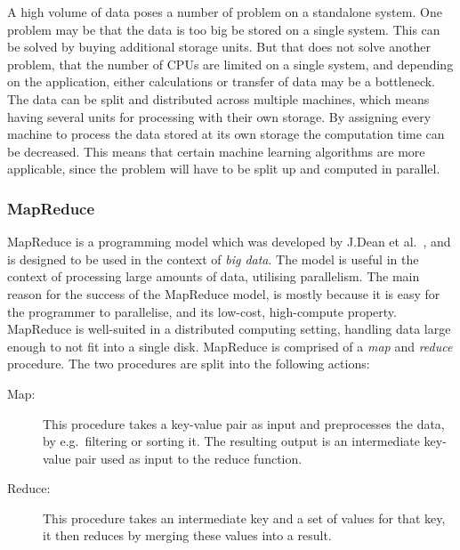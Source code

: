 A high volume of data poses a number of problem on a standalone system. One problem may be that the data is too big be stored on a single system.
This can be solved by buying additional storage units. But that does not solve another problem, that the number of CPUs are limited on a single system, and depending on the application, either calculations or transfer of data may be a bottleneck.
The data can be split and distributed across multiple machines, which means having several units for processing with their own storage. By assigning every machine to process the data stored at its own storage the computation time can be decreased.
This means that certain machine learning algorithms are more applicable, since the problem will have to be split up and computed in parallel. 

\subsubsection{MapReduce}\label{sec:mapreduce_programming_model}
MapReduce is a programming model which was developed by J.\@ Dean et al.~\cite{DeanMapReduce}, and is designed to be used in the context of \emph{big data}. The model is useful in the context of processing large amounts of data, utilising parallelism. The main reason for the success of the MapReduce model, is mostly because it is easy for the programmer to parallelise, and its low-cost, high-compute property. MapReduce is well-suited in a distributed computing setting, handling data large enough to not fit into a single disk.
MapReduce is comprised of a \emph{map} and \emph{reduce} procedure. The two procedures are split into the following actions:
\begin{description}
    \item[Map:] This procedure takes a key-value pair as input and preprocesses the data, by e.g.\ filtering or sorting it. The resulting output is an intermediate key-value pair used as input to the reduce function.
    \item[Reduce:] This procedure takes an intermediate key and a set of values for that key, it then reduces by merging these values into a result.
\end{description}

